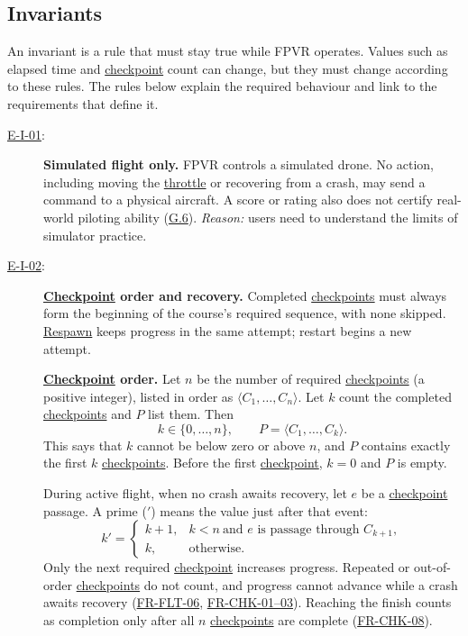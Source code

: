 \documentclass[12pt]{article}
\begin{document}
\clearpage
\subsection{Invariants}\label{e5}

An invariant is a rule that must stay true while FPVR operates. Values such as
elapsed time and \hyperlink{glos:Checkpoint}{checkpoint} count can change, but they must change according
to these rules. The rules below explain the required behaviour and link to the
requirements that define it.

\begin{description}
\item[{\hyperref[et-scope]{E-I-01}:}]\label{ei-boundary}
\textbf{Simulated flight only.}
FPVR controls a simulated drone. No action, including moving the \hypertarget{gl:Throttle}{}\hyperlink{glos:Throttle}{throttle} or
recovering from a crash, may send a command to a physical aircraft. A score or
rating also does not certify real-world piloting ability (\hyperref[g6]{G.6}).
\textit{Reason:} users need to understand the limits of simulator practice.

\item[{\hyperref[et-course]{E-I-02}:}]
\label{ei-course}
\textbf{\hyperlink{glos:Checkpoint}{Checkpoint} order and recovery.}
Completed \hyperlink{glos:Checkpoint}{checkpoints} must always form the beginning of the course's required
sequence, with none skipped. \hyperlink{glos:Respawn}{Respawn} keeps progress in the same attempt;
restart begins a new attempt.

\textbf{\hyperlink{glos:Checkpoint}{Checkpoint} order.} Let $n$ be the number of required \hyperlink{glos:Checkpoint}{checkpoints} (a positive integer),
listed in order as $\langle C_1,\ldots,C_n\rangle$. Let $k$ count the completed
\hyperlink{glos:Checkpoint}{checkpoints} and $P$ list them. Then
\[
  k\in\{0,\ldots,n\},\qquad P=\langle C_1,\ldots,C_k\rangle.
\]
This says that $k$ cannot be below zero or above $n$, and $P$ contains exactly
the first $k$ \hyperlink{glos:Checkpoint}{checkpoints}. Before the first \hyperlink{glos:Checkpoint}{checkpoint}, $k=0$ and $P$ is empty.

During active flight, when no crash awaits recovery, let $e$ be a \hyperlink{glos:Checkpoint}{checkpoint}
passage. A prime ($'$) means the value just after that event:
\[
 k'=\begin{cases}
 k+1, & k<n\ \text{and }e\text{ is passage through }C_{k+1},\\
 k, & \text{otherwise}.
 \end{cases}
\]
Only the next required \hyperlink{glos:Checkpoint}{checkpoint} increases progress. Repeated or out-of-order
\hyperlink{glos:Checkpoint}{checkpoints} do not count, and progress cannot advance while a crash awaits
recovery (\hyperref[sec:s2-flight]{FR-FLT-06},
\hyperref[sec:s2-checkpoints]{FR-CHK-01--03}). Reaching the finish counts as
completion only after all $n$ \hyperlink{glos:Checkpoint}{checkpoints} are complete
(\hyperref[sec:s2-checkpoints]{FR-CHK-08}).


\end{description}
\end{document}
